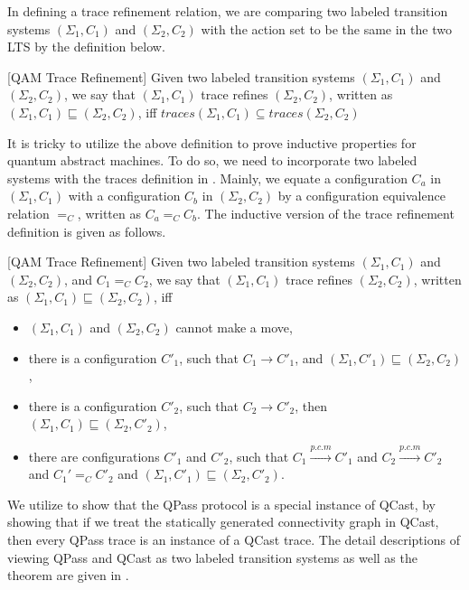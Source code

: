 In defining a trace refinement relation, we are comparing two labeled transition systems $(\Sigma_1,C_1)$ and $(\Sigma_2,C_2)$ with the action set to be the same in the two LTS by the definition below.

\begin{definition}\label{def:traceeq}\rm[QAM Trace Refinement]
Given two labeled transition systems $(\Sigma_1,C_1)$ and $(\Sigma_2,C_2)$, we say that $(\Sigma_1,C_1)$ trace refines $(\Sigma_2,C_2)$, written as $(\Sigma_1,C_1) \sqsubseteq (\Sigma_2,C_2)$, iff $traces(\Sigma_1,C_1)\subseteq traces(\Sigma_2,C_2)$

\end{definition}

It is tricky to utilize the above definition to prove inductive properties for quantum abstract machines. To do so, we need to incorporate
two labeled systems with the traces definition in .
Mainly, we equate a configuration $C_a$ in $(\Sigma_1,C_1)$ with a configuration $C_b$ in $(\Sigma_2,C_2)$ by a configuration equivalence relation $=_C$, written as $C_a =_C C_b$. The inductive version of the trace refinement definition is given as follows.

\begin{definition}\label{def:traceeq1}\rm[QAM Trace Refinement]
Given two labeled transition systems $(\Sigma_1,C_1)$ and $(\Sigma_2,C_2)$, and $C_1 =_C C_2$, we say that $(\Sigma_1,C_1)$ trace refines $(\Sigma_2,C_2)$, written as $(\Sigma_1,C_1) \sqsubseteq (\Sigma_2,C_2)$, iff

\begin{itemize}
\item $(\Sigma_1,C_1)$ and $(\Sigma_2,C_2)$ cannot make a move,
\item there is a configuration $C'_1$, such that $C_1\longrightarrow C'_1$, and $(\Sigma_1,C'_1) \sqsubseteq (\Sigma_2,C_2)$,
\item there is a configuration $C'_2$, such that $C_2\longrightarrow C'_2$, then $(\Sigma_1,C_1) \sqsubseteq (\Sigma_2,C'_2)$,
\item there are configurations $C'_1$ and $C'_2$, such that $C_1\xrightarrow{p.c.m}C'_1$ and $C_2\xrightarrow{p.c.m}C'_2$ and $C_1' =_C C'_2$ and $(\Sigma_1,C'_1) \sqsubseteq (\Sigma_2,C'_2)$.
\end{itemize}
\end{definition}

We utilize  to show that the QPass protocol is a special instance of QCast, by showing that if we treat the statically generated connectivity graph in QCast, then every QPass trace is an instance of a QCast trace. The detail descriptions of viewing QPass and QCast as two labeled transition systems as well as the theorem are given in .


